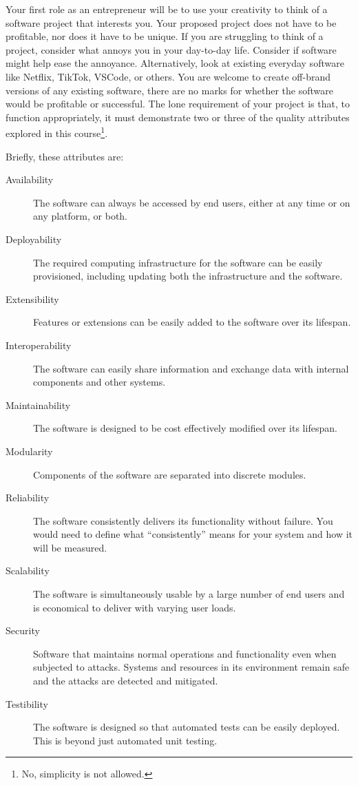 \documentclass{csse4400}
\begin{document}
Your first role as an entrepreneur will be to use your creativity to think of a software project that interests you.
Your proposed project does not have to be profitable, nor does it have to be unique.
If you are struggling to think of a project, consider what annoys you in your day-to-day life.
Consider if software might help ease the annoyance.
Alternatively, look at existing everyday software like Netflix, TikTok, VSCode, or others.
You are welcome to create off-brand versions of any existing software,
there are no marks for whether the software would be profitable or successful.
The lone requirement of your project is that, to function appropriately, it must demonstrate two or three of the quality attributes 
explored in this course\footnote{No, simplicity is not allowed.}.

\newpage\noindent
Briefly, these attributes are:
\begin{description}
    \item[Availability] The software can always be accessed by end users, either at any time or on any platform, or both.
    \item[Deployability] The required computing infrastructure for the software can be easily provisioned, including updating both the infrastructure and the software.
    \item[Extensibility] Features or extensions can be easily added to the software over its lifespan.
    \item[Interoperability] The software can easily share information and exchange data with internal components and other systems.
    \item[Maintainability] The software is designed to be cost effectively modified over its lifespan.
    \item[Modularity] Components of the software are separated into discrete modules.
    \item[Reliability] The software consistently delivers its functionality without failure. You would need to define what ``consistently'' means for your system and how it will be measured.
    \item[Scalability] The software is simultaneously usable by a large number of end users and is economical to deliver with varying user loads.
    \item[Security] Software that maintains normal operations and functionality even when subjected to attacks.
                             Systems and resources in its environment remain safe and the attacks are detected and mitigated.
    \item[Testibility] The software is designed so that automated tests can be easily deployed. This is beyond just automated unit testing.
\end{description}
\end{document}
